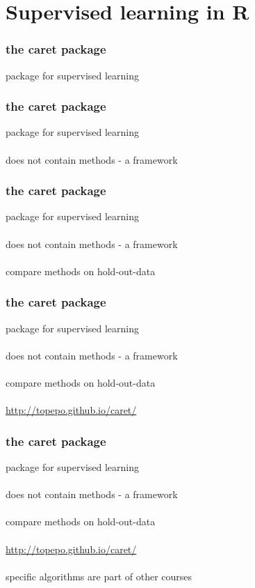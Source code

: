 \documentclass{beamer}
\begin{document}
\section{Supervised learning in R}

\begin{frame}
	\frametitle{the caret package}
	\begin{center}
		package for supervised learning
	\end{center}
\end{frame}

\begin{frame}
	\frametitle{the caret package}
	\begin{center}
		package for supervised learning\\~\\
		does not contain methods - a framework
	\end{center}
\end{frame}

\begin{frame}
	\frametitle{the caret package}
	\begin{center}
		package for supervised learning\\~\\
		does not contain methods - a framework\\~\\
		compare methods on hold-out-data
	\end{center}
\end{frame}

\begin{frame}
	\frametitle{the caret package}
	\begin{center}
		package for supervised learning\\~\\
		does not contain methods - a framework\\~\\
		compare methods on hold-out-data\\~\\
		\href{http://topepo.github.io/caret/}{http://topepo.github.io/caret/}
	\end{center}
\end{frame}

\begin{frame}
	\frametitle{the caret package}
	\begin{center}
		package for supervised learning\\~\\
		does not contain methods - a framework\\~\\
		compare methods on hold-out-data\\~\\
		\href{http://topepo.github.io/caret/}{http://topepo.github.io/caret/}\\~\\
		specific algorithms are part of other courses
	\end{center}
\end{frame}
\end{document}
